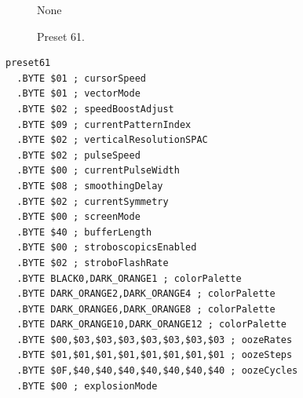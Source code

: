 \begin{minipage}[b]{0.48\linewidth}
\begin{figure}[H]                                                          
  \centering                                                             
  \begin{adjustbox}{width=5cm,center}                                   
None
  \end{adjustbox}                                                        
\caption*{Preset 61.}                                           
\end{figure}                                                               
\end{minipage}
\hspace{0.1cm}
\begin{minipage}[b]{0.48\linewidth}                                       
\begin{lstlisting}[basicstyle=\ttfamily\tiny]
preset61
  .BYTE $01 ; cursorSpeed
  .BYTE $01 ; vectorMode
  .BYTE $02 ; speedBoostAdjust
  .BYTE $09 ; currentPatternIndex
  .BYTE $02 ; verticalResolutionSPAC
  .BYTE $02 ; pulseSpeed
  .BYTE $00 ; currentPulseWidth
  .BYTE $08 ; smoothingDelay
  .BYTE $02 ; currentSymmetry
  .BYTE $00 ; screenMode
  .BYTE $40 ; bufferLength
  .BYTE $00 ; stroboscopicsEnabled
  .BYTE $02 ; stroboFlashRate
  .BYTE BLACK0,DARK_ORANGE1 ; colorPalette
  .BYTE DARK_ORANGE2,DARK_ORANGE4 ; colorPalette
  .BYTE DARK_ORANGE6,DARK_ORANGE8 ; colorPalette
  .BYTE DARK_ORANGE10,DARK_ORANGE12 ; colorPalette
  .BYTE $00,$03,$03,$03,$03,$03,$03,$03 ; oozeRates
  .BYTE $01,$01,$01,$01,$01,$01,$01,$01 ; oozeSteps
  .BYTE $0F,$40,$40,$40,$40,$40,$40,$40 ; oozeCycles
  .BYTE $00 ; explosionMode
\end{lstlisting}
\end{minipage}


